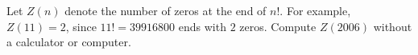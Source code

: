 Let $Z(n)$ denote the number of zeros at the end of $n!$. For example, $Z(11)=2$, since $11!=39916800$ ends with $2$ zeros. Compute $Z(2006)$ without a calculator or computer.
